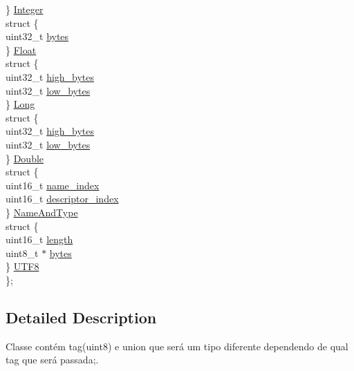 \begin{DoxyCompactItemize}
\begin{tabbing}
\>\} \hyperlink{class_cp_info_a873ae1d00d8658008893f3397ad3535b}{Integer}\\
\>struct \{\\
\>\>uint32\_t \hyperlink{class_cp_info_aff3858879ad5feb452a5fc0504e99c1b}{bytes}\\
\>\} \hyperlink{class_cp_info_a8dd439e3f1f235a10abf65991a89c0e0}{Float}\\
\>struct \{\\
\>\>uint32\_t \hyperlink{class_cp_info_a4ddca9fe1db833914bba6fccab4a4966}{high\_bytes}\\
\>\>uint32\_t \hyperlink{class_cp_info_a361c4ed0f0ba7c54dec3469e1e2b67ce}{low\_bytes}\\
\>\} \hyperlink{class_cp_info_a57c0bb8dfad66c7c75c552ab6ca45563}{Long}\\
\>struct \{\\
\>\>uint32\_t \hyperlink{class_cp_info_a4ddca9fe1db833914bba6fccab4a4966}{high\_bytes}\\
\>\>uint32\_t \hyperlink{class_cp_info_a361c4ed0f0ba7c54dec3469e1e2b67ce}{low\_bytes}\\
\>\} \hyperlink{class_cp_info_a8d321b2411c3720d3009722182a2fbd5}{Double}\\
\>struct \{\\
\>\>uint16\_t \hyperlink{class_cp_info_a8337463c52221eaead88f232ded768a7}{name\_index}\\
\>\>uint16\_t \hyperlink{class_cp_info_a1e5f422fa619e06a2deb2728be023381}{descriptor\_index}\\
\>\} \hyperlink{class_cp_info_af8ab428cfd1348391c7d3b26d94d6567}{NameAndType}\\
\>struct \{\\
\>\>uint16\_t \hyperlink{class_cp_info_a8876751cacc7818d9748366a35ef85f7}{length}\\
\>\>uint8\_t $\ast$ \hyperlink{class_cp_info_acdf9242daedb1b37c82f24e6665edb10}{bytes}\\
\>\} \hyperlink{class_cp_info_a1959c604c24ea0a8c2ab8a4f3094f3e0}{UTF8}\\
\}; \\

\end{tabbing}\end{DoxyCompactItemize}


\subsection{Detailed Description}
Classe contém tag(uint8) e union que será um tipo diferente dependendo de qual tag que será passada;. 

